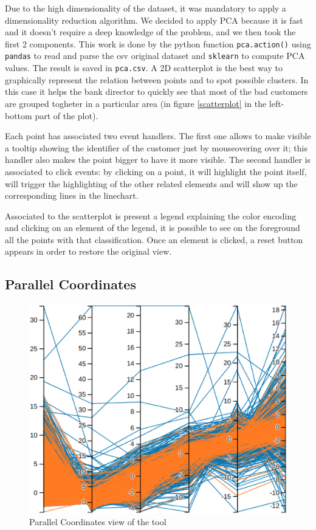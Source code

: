 \documentclass[journal]{vgtc}                %
\begin{document}
Due to the high dimensionality of the dataset, it was mandatory to apply a dimensionality reduction algorithm. We decided to apply PCA because it is fast and it doesn't require a deep knowledge of the problem, and we then took the first 2 components. This work is done by the python function \texttt{pca.action()} using \texttt{pandas} to read and parse the csv original dataset
and \texttt{sklearn} to compute PCA values. The result is saved in \texttt{pca.csv}.
A 2D scatterplot is the best way to graphically represent the relation between points and to spot possible clusters. In this case it helps the bank director to quickly see that most of the bad customers are grouped togheter in a particular area (in figure \ref{scatterplot} in the left-bottom part of the plot).

Each point has associated two event handlers. The first one allows to make visible a tooltip showing the identifier of the customer just by mouseovering over it; this handler also makes the point bigger to have it more visible.
The second handler is associated to click events: by clicking on a point, it will highlight the point itself, will trigger the highlighting of the other related elements and will show up the corresponding lines in the linechart.

Associated to the scatterplot is present a legend explaining the color encoding and clicking on an element of the legend, it is possible to see on the foreground all the points with that classification. Once an element is clicked, a reset button appears in order to
restore the original view.

\subsection{Parallel Coordinates}
\begin{figure}[h]
  \centering
  \includegraphics[scale=0.15]{parallel}
  \caption{Parallel Coordinates view of the tool}
  \label{parallel}
\end{figure}
\end{document}
